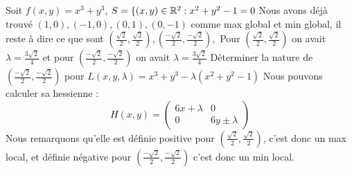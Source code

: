 \begin{exemple}
    Soit $f(x,y) = x^3+y^3$, $S = \{(x,y)\in \mathbb{R}^2 : x^2 + y^2 -1 = 0$
    Nous avons déjà trouvé $(1,0),(-1,0),(0,1),(0,-1)$ comme max global et min global, il reste à dire ce que sont $(\frac{\sqrt2}{2},\frac{\sqrt2}{2}),(\frac{-\sqrt2}{2},\frac{-\sqrt2}{2}),$
    Pour $(\frac{\sqrt2}{2},\frac{\sqrt2}{2})$ on avait $\lambda = \frac{3\sqrt2}{4}$ et pour $(\frac{-\sqrt2}{2},\frac{-\sqrt2}{2})$ on avait $\lambda = \frac{3\sqrt2}{4}$
    Déterminer la nature de $(\frac{-\sqrt2}{2},\frac{-\sqrt2}{2})$ pour $L(x,y,\lambda) = x^3+y^3-\lambda(x^2+y^2-1)$
    Nous pouvons calculer sa hessienne :
    $$H(x,y) = \begin{pmatrix}
        6x+\lambda & 0\\
        0 & 6y \pm \lambda
    \end{pmatrix}$$
    Nous remarquons qu'elle est définie positive pour $(\frac{\sqrt2}{2},\frac{\sqrt2}{2})$, c'est donc un max local, et définie négative pour $(\frac{-\sqrt2}{2},\frac{-\sqrt2}{2})$ c'est donc un min local.
\end{exemple}

